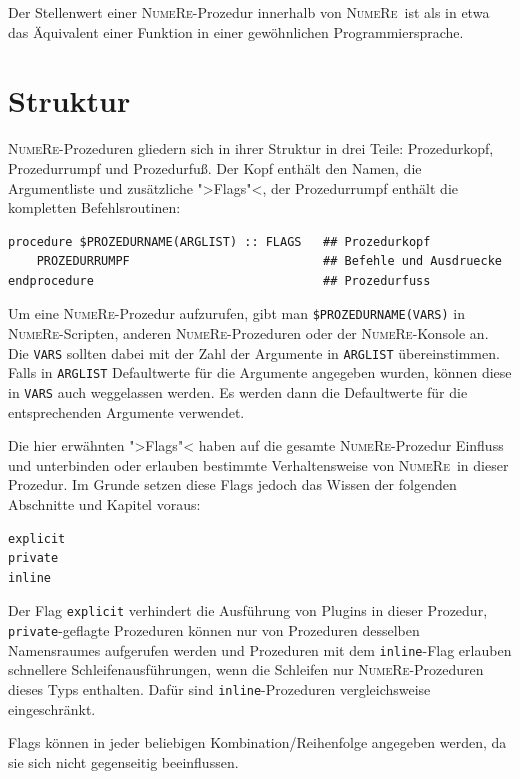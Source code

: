 \documentclass[DIV=14,headsepline,footsepline]{scrbook}
\newcommand{\NR}{\textsc{Nu\-me\-Re}}
\begin{document}
				Der Stellenwert einer \NR-Prozedur innerhalb von \NR\ ist als in etwa das Äquivalent einer Funktion in einer gewöhnlichen Programmiersprache.
				
			\section{Struktur}
				\NR-Prozeduren gliedern sich in ihrer Struktur in drei Teile: Prozedurkopf, Prozedurrumpf und Prozedurfuß. Der Kopf enthält den Namen, die Argumentliste und zusätzliche ">Flags"<, der Prozedurrumpf enthält die kompletten Befehlsroutinen:
				\begin{lstlisting}
procedure $PROZEDURNAME(ARGLIST) :: FLAGS   ## Prozedurkopf
	PROZEDURRUMPF                           ## Befehle und Ausdruecke
endprocedure                                ## Prozedurfuss
				\end{lstlisting}
				Um eine \NR-Prozedur aufzurufen, gibt man \verb+$PROZEDURNAME(VARS)+ in \NR-Scrip\-ten, anderen \NR-Prozeduren oder der \NR-Konsole an. Die \verb+VARS+ sollten dabei mit der Zahl der Argumente in \verb+ARGLIST+ übereinstimmen. Falls in \verb+ARGLIST+ Defaultwerte für die Argumente angegeben wurden, können diese in \verb+VARS+ auch weggelassen werden. Es werden dann die Defaultwerte für die entsprechenden Argumente verwendet.
				
				Die hier erwähnten ">Flags"< haben auf die gesamte \NR-Prozedur Einfluss und unterbinden oder erlauben bestimmte Verhaltensweise von \NR\ in dieser Prozedur. Im Grunde setzen diese Flags jedoch das Wissen der folgenden Abschnitte und Kapitel voraus:
				\begin{lstlisting}
explicit
private
inline
				\end{lstlisting}
				Der Flag \verb+explicit+ verhindert die Ausführung von Plugins in dieser Prozedur, \verb+private+-geflagte Prozeduren können nur von Prozeduren desselben Namensraumes aufgerufen werden und Prozeduren mit dem \verb+inline+-Flag erlauben schnellere Schleifenausführungen, wenn die Schleifen nur \NR-Pro\-ze\-du\-ren dieses Typs enthalten. Dafür sind \verb+inline+-Pro\-ze\-du\-ren vergleichsweise eingeschränkt.
				
				Flags können in jeder beliebigen Kombination/Reihenfolge angegeben werden, da sie sich nicht gegenseitig beeinflussen.
				
\end{document}
